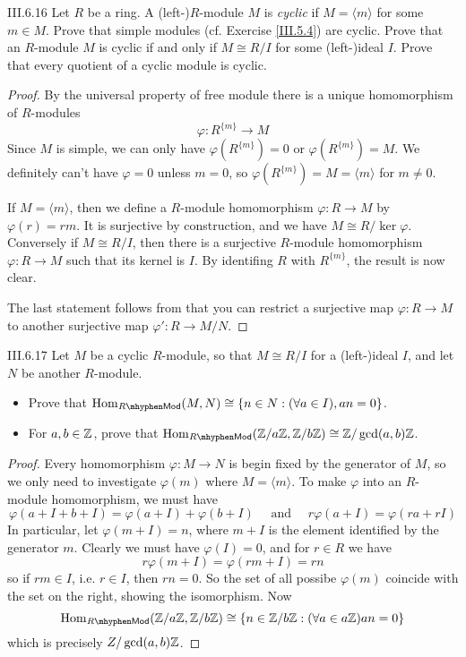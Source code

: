 \begin{problem}{III.6.16}
Let $R$ be a ring. A (left-)$R$-module $M$ is \emph{cyclic} if $M = \langle m \rangle$ for some $m \in M$. Prove that simple modules (cf. Exercise \ref{III.5.4}) are cyclic. Prove that an $R$-module $M$ is cyclic if and only if $M \cong R/I$ for some (left-)ideal $I.$ Prove that
every quotient of a cyclic module is cyclic.
\end{problem}
\begin{proof}
By the universal property of free module there is a unique homomorphism of $R$-modules
\[
\varphi : R^{\{m\}} \to M
\]
Since $M$ is simple, we can only have $\varphi(R^{\{m\}}) = 0$ or $\varphi(R^{\{m\}}) = M$. We definitely can't have $\varphi = 0$ unless $m = 0$, so $\varphi(R^{\{m\}}) = M = \langle m \rangle$ for $m \neq 0$.

If $M = \langle m \rangle$, then we define a $R$-module homomorphism $\varphi: R \to M$ by $\varphi(r) = rm$. It is surjective by construction, and we have $M \cong R/\ker \varphi$.
Conversely if $M \cong R/I$, then there is a surjective $R$-module homomorphism $\varphi: R \to M$ such that its kernel is $I$. By identifing $R$ with $R^{\{m\}}$, the result is now clear.

The last statement follows from that you can restrict a surjective map $\varphi: R \to M$ to another surjective map $\varphi': R \to M/N$.
\end{proof}

\begin{problem}{III.6.17}
Let $M$ be a cyclic $R$-module, so that $M \cong R/I$ for a (left-)ideal $I$, and let $N$ be another $R$-module.
\begin{itemize}
    \setlength\itemsep{0pt}
    \item Prove that $\Hom_{R\mhyphen \mathsf{Mod}}(M,N) \cong \{n \in N : (\forall a \in I), an = 0\}$.
    \item For $a, b \in \mathbb{Z}$, prove that $\Hom_{R \mhyphen \mathsf{Mod}}(\Z/a\Z, \Z/b\Z) \cong \Z/\gcd(a,b)\Z$.
\end{itemize}
\end{problem}
\begin{proof}
Every homomorphism $\varphi: M \to N$ is begin fixed by the generator of $M$, so we only need to investigate $\varphi(m)$ where $M = \langle m \rangle$. To make $\varphi$ into an $R$-module homomorphism, we must have
\[
\varphi(a+I+b+I) = \varphi(a+I) + \varphi(b+I) \quad \text{ and } \quad  r\varphi(a+I) = \varphi(ra+rI)
\]
In particular, let $\varphi(m+I) = n$, where $m+I$ is the element identified by the generator $m$. Clearly we must have $\varphi(I) = 0$, and for $r \in R$ we have
\[
r\varphi(m+I) = \varphi(rm + I) = rn
\]
so if $rm \in I$, i.e. $r \in I$, then $rn = 0$. So the set of all possibe $\varphi(m)$ coincide with the set on the right, showing the isomorphism. Now
\[
\Hom_{R \mhyphen \mathsf{Mod}}(\Z/a\Z, \Z/b\Z) \cong \{n \in \Z/b\Z : (\forall a \in a\Z) an = 0\}
\]
which is precisely $Z/\gcd(a,b)\mathbb{Z}$.
\end{proof}

